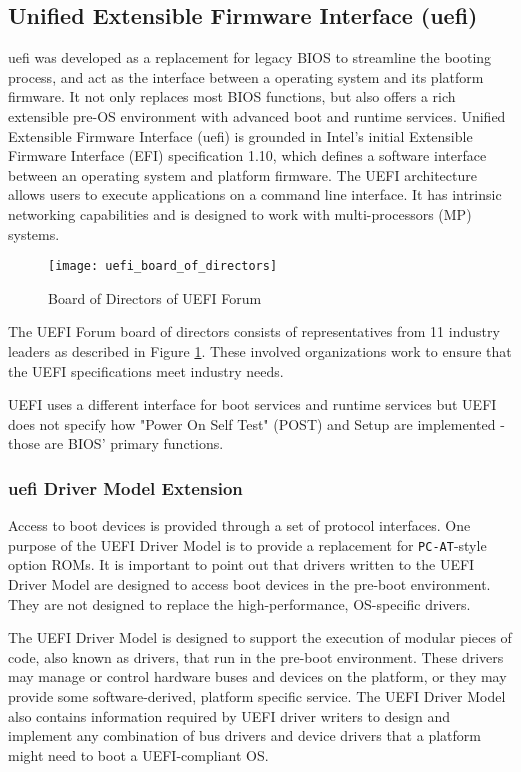 \subsection{Unified Extensible Firmware Interface (\gls{uefi})}
\gls{uefi} was developed as a replacement for legacy BIOS to streamline the booting process, and act as the interface between a operating system and its platform firmware. It not only replaces most BIOS functions, but also offers a rich extensible pre-OS environment with advanced boot and runtime services.
Unified Extensible Firmware Interface (\gls{uefi}) is grounded in Intel's initial Extensible Firmware Interface (EFI) specification 1.10, which defines a software interface between an operating system and platform firmware. The UEFI architecture allows users to execute applications on a command line interface. It has intrinsic networking capabilities and is designed to work with multi-processors (MP) systems.

\begin{figure}[h]
	\texttt{[image: uefi\_board\_of\_directors]}
	\caption{Board of Directors of UEFI Forum}\label{fig:introduction-uefi-board-of-directors}
\end{figure}

The UEFI Forum board of directors consists of representatives from 11 industry leaders as described in Figure \ref{fig:introduction-uefi-board-of-directors}. These involved organizations work to ensure that the UEFI specifications meet industry needs.

UEFI uses a different interface for boot services and runtime services but UEFI does not specify how "Power On Self Test" (POST) and Setup are implemented - those are BIOS' primary functions.

\subsubsection{\gls{uefi} Driver Model Extension}
Access to boot devices is provided through a set of protocol interfaces. One purpose of the
UEFI Driver Model is to provide a replacement for \verb|PC-AT|-style option ROMs. It is important
to point out that drivers written to the UEFI Driver Model are designed to access boot devices in
the pre-boot environment. They are not designed to replace the high-performance, OS-specific
drivers.

The UEFI Driver Model is designed to support the execution of modular pieces of code,
also known as drivers, that run in the pre-boot environment. These drivers may manage or control
hardware buses and devices on the platform, or they may provide some software-derived, platform specific service. The UEFI Driver Model also contains information required by UEFI driver writers to design and implement any combination of bus drivers and device drivers that a platform
might need to boot a UEFI-compliant OS.

